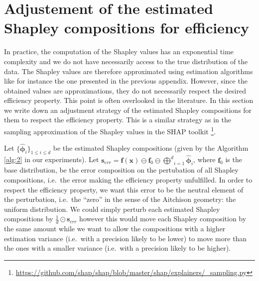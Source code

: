 \documentclass{article}
\theoremstyle{plain}
\theoremstyle{definition}
\theoremstyle{remark}
\begin{document}
\newpage
\section{Adjustement of the estimated Shapley compositions for efficiency}
\label{app:correct}

In practice, the computation of the Shapley values has an exponential time complexity and we do not have necessarily access to the true distribution of the data. The Shapley values are therefore approximated using estimation algorithms like for instance the one presented in the previous appendix. However, since the obtained values are approximations, they do not necessarily respect the desired efficiency property. This point is often overlooked in the literature. In this section we write down an adjustment strategy of the estimated Shapley compositions for them to respect the efficiency property. This is a similar strategy as in the sampling approximation of the Shapley values in the SHAP toolkit \cite{NIPS2017_7062}\footnote{\url{https://github.com/shap/shap/blob/master/shap/explainers/_sampling.py}}.

Let $\{\hat{\bm{\phi}}_i\}_{1\leq i \leq d}$ be the estimated Shapley compositions (given by the Algorithm \ref{alg:2} in our experiments). Let $\displaystyle \bm{s}_{err} = \bm{f}(\bm{x}) \ominus \bm{f}_0 \ominus \underset{i=1}{\overset{d}\bigoplus} \hat{\bm{\phi}}_i$, where $\bm{f}_0$ is the base distribution, be the error composition on the pertubation of all Shapley compositions, i.e.~the error making the efficiency property unfulfilled. In order to respect the efficiency property, we want this error to be the neutral element of the perturbation, i.e.~the ``zero'' in the sense of the Aitchison geometry: the uniform distribution. We could simply perturb each estimated Shapley compositions by $\frac{1}{d}\odot\bm{s}_{err}$ however this would move each Shapley composition by the same amount while we want to allow the compositions with a higher estimation variance (i.e.~with a precision likely to be lower) to move more than the ones with a smaller variance (i.e.~with a precision likely to be higher).
\end{document}
